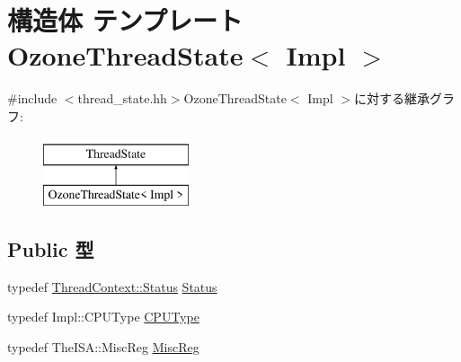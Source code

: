 \hypertarget{structOzoneThreadState}{
\section{構造体 テンプレート OzoneThreadState$<$ Impl $>$}
\label{structOzoneThreadState}
}


{\ttfamily \#include $<$thread\_\-state.hh$>$}OzoneThreadState$<$ Impl $>$に対する継承グラフ:\begin{figure}[H]
\begin{center}
\leavevmode
\includegraphics[height=2cm]{structOzoneThreadState}
\end{center}
\end{figure}
\subsection*{Public 型}
\begin{DoxyCompactItemize}
\item 
typedef \hyperlink{classThreadContext_a67a0db04d321a74b7e7fcfd3f1a3f70b}{ThreadContext::Status} \hyperlink{structOzoneThreadState_a3af29dcea6d2bbb0a1de56f02ec789f1}{Status}
\item 
typedef Impl::CPUType \hyperlink{structOzoneThreadState_ad0cc927c8534eaba1d99c29b2942311f}{CPUType}
\item 
typedef TheISA::MiscReg \hyperlink{structOzoneThreadState_aaf5f073a387db0556d1db4bcc45428bc}{MiscReg}
\end{DoxyCompactItemize}
